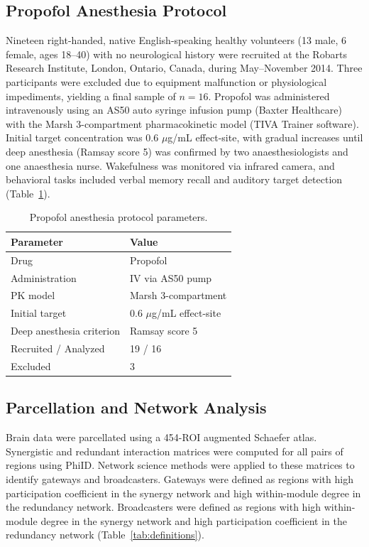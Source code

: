 \documentclass[11pt]{article}
\begin{document}
\subsection{Propofol Anesthesia Protocol}

Nineteen right-handed, native English-speaking healthy volunteers (13 male, 6 female, ages 18--40) with no neurological history were recruited at the Robarts Research Institute, London, Ontario, Canada, during May--November 2014. Three participants were excluded due to equipment malfunction or physiological impediments, yielding a final sample of $n = 16$. Propofol was administered intravenously using an AS50 auto syringe infusion pump (Baxter Healthcare) with the Marsh 3-compartment pharmacokinetic model (TIVA Trainer software). Initial target concentration was 0.6 $\mu$g/mL effect-site, with gradual increases until deep anesthesia (Ramsay score 5) was confirmed by two anaesthesiologists and one anaesthesia nurse. Wakefulness was monitored via infrared camera, and behavioral tasks included verbal memory recall and auditory target detection (Table~\ref{tab:anesthesia}).

\begin{table}[htbp]
\centering
\caption{Propofol anesthesia protocol parameters.}
\label{tab:anesthesia}
\begin{tabular}{ll}
\toprule
Parameter & Value \\
\midrule
Drug & Propofol \\
Administration & IV via AS50 pump \\
PK model & Marsh 3-compartment \\
Initial target & 0.6 $\mu$g/mL effect-site \\
Deep anesthesia criterion & Ramsay score 5 \\
Recruited / Analyzed & 19 / 16 \\
Excluded & 3 \\
\bottomrule
\end{tabular}
\end{table}

\subsection{Parcellation and Network Analysis}

Brain data were parcellated using a 454-ROI augmented Schaefer atlas. Synergistic and redundant interaction matrices were computed for all pairs of regions using PhiID. Network science methods were applied to these matrices to identify gateways and broadcasters. Gateways were defined as regions with high participation coefficient in the synergy network and high within-module degree in the redundancy network. Broadcasters were defined as regions with high within-module degree in the synergy network and high participation coefficient in the redundancy network (Table~\ref{tab:definitions}).
\end{document}
